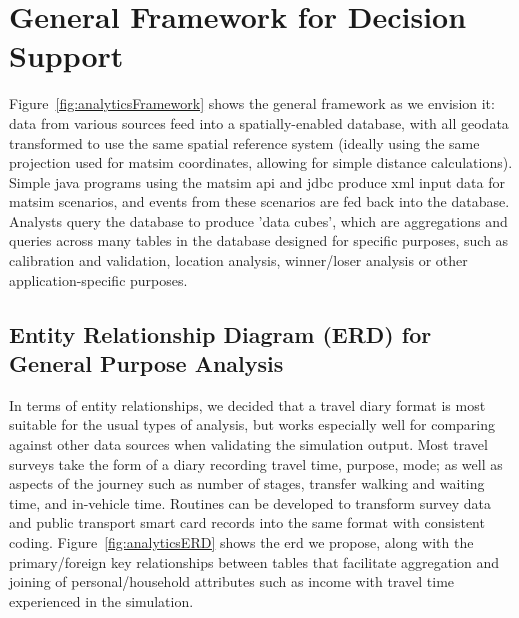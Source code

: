 \section{General Framework for Decision Support}
Figure~\ref{fig:analyticsFramework} shows the general framework as we envision it: data from various sources feed into a spatially-enabled database, with all geodata transformed to use the same spatial reference system (ideally using the same projection used for \gls{matsim} coordinates, allowing for simple distance calculations). Simple \gls{java} programs using the \gls{matsim} \gls{api} and \gls{jdbc} produce \gls{xml} input data for \gls{matsim} scenarios, and events from these scenarios are fed back into the database. Analysts query the database to produce 'data cubes', which are aggregations and queries across many tables in the database designed for specific purposes, such as calibration and validation, location analysis, winner/loser analysis or other application-specific purposes.

\subsection{Entity Relationship Diagram (ERD) for General Purpose Analysis}
In terms of entity relationships, we decided that a travel diary format is most suitable for the usual types of analysis, but works especially well for comparing against other data sources when validating the simulation output. Most travel surveys take the form of a diary recording travel time, purpose, mode; as well as aspects of the journey such as number of stages, transfer walking and waiting time, and in-vehicle time. Routines can be developed to transform survey data  and public transport smart card records into the same format with consistent coding. Figure~\ref{fig:analyticsERD} shows the \gls{erd} we propose, along with the primary/foreign key relationships between tables that facilitate aggregation and joining of \eg personal/household attributes such as income with travel time experienced in the simulation.

